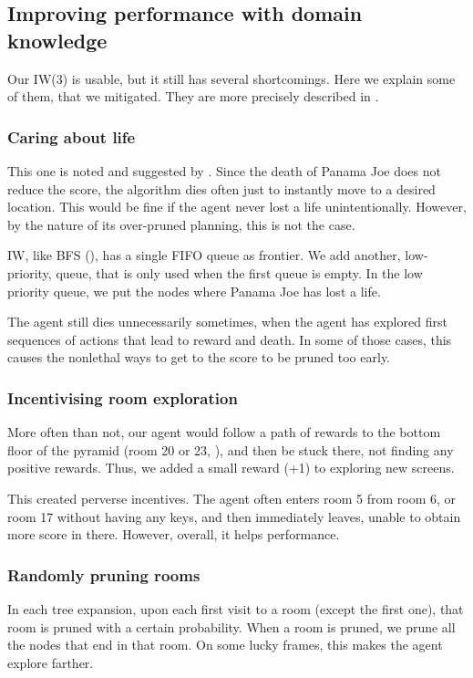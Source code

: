 \subsection{Improving performance with domain knowledge}
Our \ac{IW}(3) is usable, but it still has several shortcomings. Here we explain
some of them, that we mitigated. They are more precisely described in
.

\subsubsection{Caring about life}
This one is noted and suggested by \citet{lipovetzky2015classical}. Since the
death of Panama Joe does not reduce the score, the algorithm dies often just to
instantly move to a desired location. This would be fine if the agent never lost
a life unintentionally. However, by the nature of its over-pruned planning, this
is not the case.

\ac{IW}, like \ac{BFS} (), has a single \ac{FIFO} queue as
frontier. We add another, low-priority, queue, that is only used when
the first queue is empty. In the low priority queue, we put the nodes where
Panama Joe has lost a life.

The agent still dies unnecessarily sometimes, when the agent has explored first
sequences of actions that lead to reward and death. In some of those
cases, this causes the nonlethal ways to get to the score to be pruned too early.

\subsubsection{Incentivising room exploration}
More often than not, our agent would follow a path of rewards to the bottom
floor of the pyramid (room 20 or 23, ), and then be
stuck there, not finding any positive rewards. Thus, we added a small reward
(+1) to exploring new screens.

This created perverse incentives. The agent often enters room 5 from room 6, or
room 17 without having any keys, and then immediately leaves, unable to obtain
more score in there. However, overall, it helps performance.

\subsubsection{Randomly pruning rooms}
In each tree expansion, upon each first visit to a room (except the first one),
that room is pruned with a certain probability. When a room is pruned, we prune
all the nodes that end in that room. On some lucky frames, this makes the agent
explore farther.

